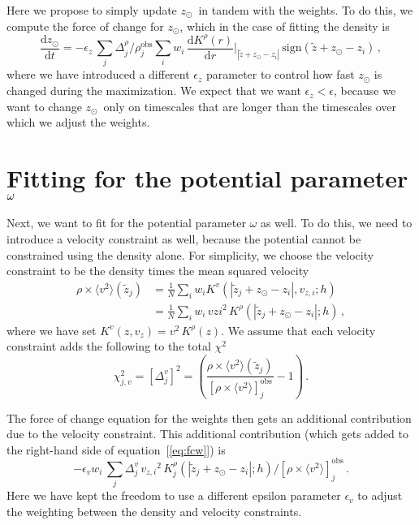\documentclass[12pt,preprint]{aastex}
\newcommand{\dd}{\mathrm{d}}
\newcommand{\eqnname}{equation}
\newcommand{\equationname}{\eqnname}
\newcommand{\zsun}{\ensuremath{z_\odot}}
\newcommand{\vz}{\ensuremath{v_z}}
\newcommand{\vzi}{\ensuremath{v_{z,i}}}
\newcommand{\zi}{\ensuremath{z_i}}
\newcommand{\wi}{\ensuremath{w_i}}
\newcommand{\zobs}{\ensuremath{\tilde{z}}}
\newcommand{\eps}{\ensuremath{\epsilon}}
\begin{document}
Here we propose to simply update \zsun\ in tandem with the weights. To
do this, we compute the force of change for \zsun, which in the case
of fitting the density is
\begin{equation}
\frac{\dd \zsun}{\dd t} = -\eps_z\,\sum_j \Delta^\rho_j/\rho^{\mathrm{obs}}_j \sum_i w_i\,\frac{\dd K^\rho(r)}{\dd r}\Bigg|_{|\zobs+\zsun-\zi|}\,\mathrm{sign}(\zobs+\zsun-\zi)\,,
\end{equation}
where we have introduced a different $\eps_z$ parameter to control how
fast $\zsun$ is changed during the maximization. We expect that we
want $\eps_z < \eps$, because we want to change \zsun\ only on
timescales that are longer than the timescales over which we adjust
the weights.

\section{Fitting for the potential parameter $\protect\omega$}

Next, we want to fit for the potential parameter $\omega$ as well. To
do this, we need to introduce a velocity constraint as well, because
the potential cannot be constrained using the density alone. For
simplicity, we choose the velocity constraint to be the density times
the mean squared velocity
\begin{equation}
\begin{split}
  \rho\times\langle v^2 \rangle (\zobs_j) & = \frac{1}{N}\sum_i \wi K^v(|\zobs_j+\zsun - \zi|,\vzi;h)\\
  & = \frac{1}{N}\sum_i \wi\,vzi^2\, K^\rho(|\zobs_j+\zsun - \zi|;h)\,,
\end{split}
\end{equation}
where we have set $K^v(z,\vz) = v^2\,K^\rho(z)$. We assume that each
velocity constraint adds the following to the total $\chi^2$
\begin{equation}
\chi^2_{j,v} = [\Delta^v_j]^2 = \left(\frac{\rho\times\langle v^2 \rangle (\zobs_j)}{[\rho\times\langle v^2 \rangle]_j^{\mathrm{obs}}}-1\right)\,.
\end{equation}

The force of change equation for the weights then gets an additional
contribution due to the velocity constraint. This additional
contribution (which gets added to the right-hand side of
\equationname~[\ref{eq:fcw}]) is
\begin{equation}\label{eq:fcwv2}
    -\eps_v \wi \,\sum_j \Delta^v_j\, \vzi^2\,K^\rho_j(|\zobs_j+\zsun - \zi|;h)/[\rho\times\langle v^2 \rangle]_j^{\mathrm{obs}}\,.
\end{equation}
Here we have kept the freedom to use a different epsilon parameter
$\eps_v$ to adjust the weighting between the density and velocity
constraints.
\end{document}
